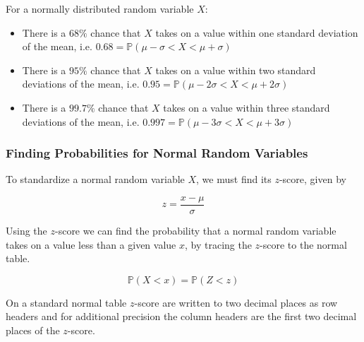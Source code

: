 \documentclass[12pt letter]{report}
\begin{document}

For a normally distributed random variable $X$:

\begin{itemize}
  \item There is a $68\%$ chance that $X$ takes on a value within one standard deviation of the mean, i.e. $0.68 = \mathbb{P}
          \left( \mu - \sigma < X < \mu + \sigma  \right) $
  \item There is a $95\%$ chance that $X$ takes on a value within two standard deviations of the mean, i.e. $0.95 = \mathbb{P}
          \left( \mu - 2 \sigma < X < \mu + 2 \sigma  \right) $
  \item There is a $99.7\%$ chance that $X$ takes on a value within three standard deviations of the mean, i.e. $0.997 = \mathbb{P}
          \left( \mu - 3 \sigma < X < \mu + 3 \sigma  \right) $
\end{itemize}

\subsubsection{Finding Probabilities for Normal Random Variables}



To standardize a normal random variable $X$, we must find its $z$-score, given by

\[
  z = \frac{x - \mu }{\sigma }
\]



Using the $z$-score we can find the probability that a normal random variable takes on a value less than a given value
$x$, by tracing the $z$-score to the normal table.

\[
  \mathbb{P} \left( X < x \right) = \mathbb{P} \left( Z < z \right)
\]

On a standard normal table $z$-score are written to two decimal places as row headers and for additional precision the
column headers are the first two decimal places of the $z$-score.
\end{document}
